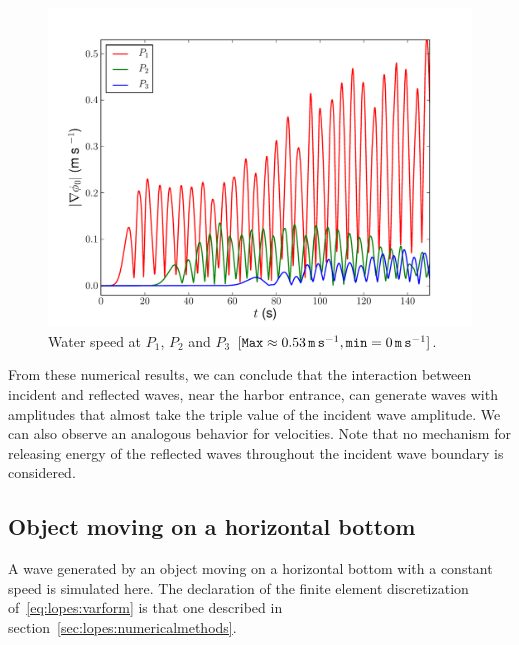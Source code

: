 \begin{figure}
\begin{center}
\includegraphics[width=\largefig]{chapters/lopes/pdf/velprofile.pdf}
\end{center}
\caption{Water speed at $P_1$, $P_2$ and $P_3$ $[{\tt
      Max}\approx 0.53\, {\tt m\, s}^{-1}, {\tt min}=0\,{\tt
      m\, s}^{-1}]$.}
\label{fig:lopes:velp}
\end{figure}

From these numerical results, we can conclude that the
interaction between incident and reflected waves, near the
harbor entrance, can generate waves with amplitudes that almost
take the triple value of the incident wave amplitude.  We
can also observe an analogous behavior for velocities.  Note
that no mechanism for releasing energy of the reflected
waves throughout the incident wave boundary is considered.


\subsection{Object moving on a horizontal bottom}
A wave generated by an object moving on a horizontal bottom
with a constant speed is simulated here.  The declaration of
the finite element discretization
of~\eqref{eq:lopes:varform}
is that one described in
section~\ref{sec:lopes:numericalmethods}.

